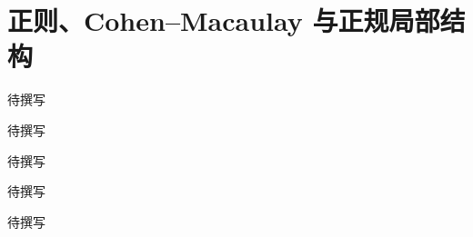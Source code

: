 
% 
% 

\chapter{正则、Cohen–Macaulay 与正规局部结构}
\label{g5:ch:09}

\begin{chapterabstract}
待撰写
\end{chapterabstract}

\begin{learninggoals}
待撰写
\end{learninggoals}

待撰写








\begin{chaptersummary}
待撰写
\end{chaptersummary}

\BookExercises
待撰写
